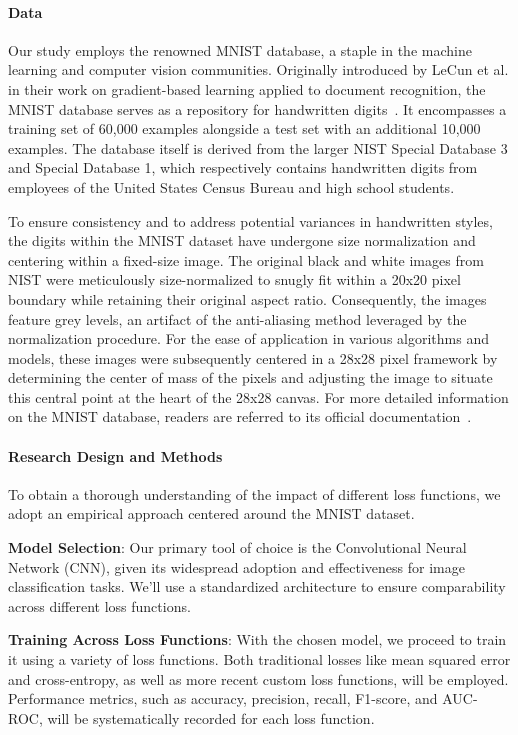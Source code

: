 \documentclass[12pt]{article}
\begin{document}
\paragraph{Data}
Our study employs the renowned MNIST database, a staple in the machine learning and computer vision communities. Originally introduced by LeCun et al. in their work on gradient-based learning applied to document recognition, the MNIST database serves as a repository for handwritten digits~\citep{mnist_source}. It encompasses a training set of 60,000 examples alongside a test set with an additional 10,000 examples. The database itself is derived from the larger NIST Special Database 3 and Special Database 1, which respectively contains handwritten digits from employees of the United States Census Bureau and high school students.

To ensure consistency and to address potential variances in handwritten styles, the digits within the MNIST dataset have undergone size normalization and centering within a fixed-size image. The original black and white images from NIST were meticulously size-normalized to snugly fit within a 20x20 pixel boundary while retaining their original aspect ratio. Consequently, the images feature grey levels, an artifact of the anti-aliasing method leveraged by the normalization procedure. For the ease of application in various algorithms and models, these images were subsequently centered in a 28x28 pixel framework by determining the center of mass of the pixels and adjusting the image to situate this central point at the heart of the 28x28 canvas. For more detailed information on the MNIST database, readers are referred to its official documentation~\citep{mnist_source}.

\paragraph{Research Design and Methods}
To obtain a thorough understanding of the impact of different loss functions, we adopt an empirical approach centered around the MNIST dataset.

\textbf{Model Selection}: Our primary tool of choice is the Convolutional Neural Network (CNN), given its widespread adoption and effectiveness for image classification tasks. We'll use a standardized architecture to ensure comparability across different loss functions.

\textbf{Training Across Loss Functions}: With the chosen model, we proceed to train it using a variety of loss functions. Both traditional losses like mean squared error and cross-entropy, as well as more recent custom loss functions, will be employed. Performance metrics, such as accuracy, precision, recall, F1-score, and AUC-ROC, will be systematically recorded for each loss function.
\end{document}
